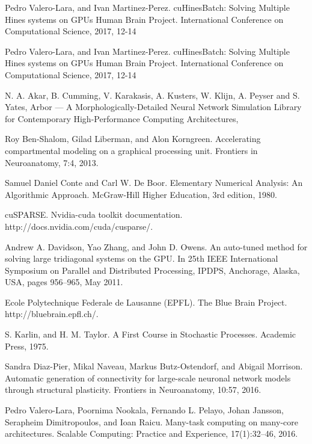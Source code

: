 \clearpage
\newpage
{} %
\begin{thebibliography}{1}
  Pedro Valero-Lara, and Ivan Martinez-Perez.
  cuHinesBatch: Solving Multiple Hines systems on GPUs Human Brain Project. 
  International Conference on Computational 
  Science, 2017, 12-14

  Pedro Valero-Lara, and Ivan Martinez-Perez.
  cuHinesBatch: Solving Multiple Hines systems on GPUs Human Brain Project. 
  International Conference on Computational 
  Science, 2017, 12-14

  N. A. Akar, B. Cumming, V. Karakasis, A. Kusters, W. Klijn, A. Peyser and S. Yates,
  Arbor --- A Morphologically-Detailed Neural Network Simulation Library for Contemporary High-Performance Computing Architectures,

  Roy Ben-Shalom, Gilad Liberman, and Alon Korngreen. Accelerating compartmental modeling
  on a graphical processing unit. Frontiers in Neuroanatomy, 7:4, 2013.

  Samuel Daniel Conte and Carl W. De Boor. Elementary Numerical Analysis: An Algorithmic
  Approach. McGraw-Hill Higher Education, 3rd edition, 1980.

  cuSPARSE. Nvidia-cuda toolkit documentation. http://docs.nvidia.com/cuda/cusparse/.

  Andrew A. Davidson, Yao Zhang, and John D. Owens. An auto-tuned method for solving large
tridiagonal systems on the GPU. In 25th IEEE International Symposium on Parallel and Distributed
  Processing, IPDPS, Anchorage, Alaska, USA, pages 956–965, May 2011.
  
  Ecole Polytechnique Federale de Lausanne (EPFL). The Blue Brain Project.
  http://bluebrain.epfl.ch/.

  S. Karlin, and H. M. Taylor. A First Course in Stochastic Processes. Academic Press, 1975.

  Sandra Diaz-Pier, Mikal Naveau, Markus Butz-Ostendorf, and Abigail Morrison. Automatic generation
  of connectivity for large-scale neuronal network models through structural plasticity. Frontiers
  in Neuroanatomy, 10:57, 2016.

  Pedro Valero-Lara, Poornima Nookala, Fernando L. Pelayo, Johan Jansson, Serapheim Dimitropoulos,
  and Ioan Raicu. Many-task computing on many-core architectures. Scalable Computing:
  Practice and Experience, 17(1):32–46, 2016.


\end{thebibliography}
